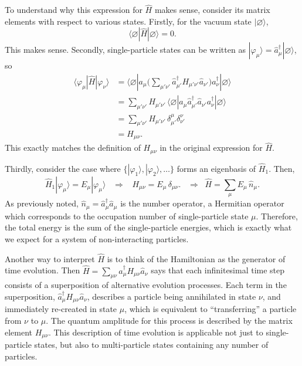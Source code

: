 \documentclass[pra,12pt]{revtex4}
\begin{document}
To understand why this expression for $\hat{H}$ makes sense, consider
its matrix elements with respect to various states.  Firstly, for the
vacuum state $|\varnothing\rangle$,
$$\langle\varnothing|\hat{H}|\varnothing\rangle = 0.$$
This makes sense. Secondly, single-particle states can be written as
$|\varphi_\mu\rangle = \hat{a}^\dagger_\mu|\varnothing\rangle$, so
$$\begin{aligned}\langle\varphi_\mu|\hat{H}|\varphi_\nu\rangle &= \langle\varnothing|a_\mu \Big(\sum_{\mu'\nu'} \hat{a}^\dagger_{\mu'} H_{\mu'\nu'} \hat{a}_{\nu'}\Big) a_\nu^\dagger |\varnothing\rangle \\ &= \sum_{\mu'\nu'} H_{\mu'\nu'} \, \langle\varnothing|a_\mu \hat{a}^\dagger_{\mu'}  \hat{a}_{\nu'} a_\nu^\dagger |\varnothing\rangle \\ &= \sum_{\mu'\nu'} H_{\mu'\nu'} \, \delta^{\mu}_{\mu'} \delta^{\nu}_{\nu'} \\&= H_{\mu\nu}.\end{aligned}$$
This exactly matches the definition of $H_{\mu\nu}$ in the original
expression for $\hat{H}$.

Thirdly, consider the case where
$\{|\varphi_1\rangle,|\varphi_2\rangle,\dots\}$ forms an eigenbasis of
$\hat{H}_1$.  Then,
$$\hat{H}_1|\varphi_\mu\rangle = E_\mu |\varphi_\mu\rangle \;\;\;\Rightarrow\;\;\; H_{\mu\nu} = E_\mu\,\delta_{\mu\nu}. \;\;\;\Rightarrow \;\; \hat{H} = \sum_{\mu} E_\mu \,\hat{n}_\mu.$$
As previously noted, $\hat{n}_\mu = \hat{a}^\dagger_\mu \hat{a}_\mu$
is the number operator, a Hermitian operator which corresponds to the
occupation number of single-particle state $\mu$.  Therefore, the
total energy is the sum of the single-particle energies, which is
exactly what we expect for a system of non-interacting particles.

Another way to interpret $\hat{H}$ is to think of the Hamiltonian as
the generator of time evolution.  Then $\hat{H} = \sum_{\mu\nu}
\hat{a}^\dagger_\mu H_{\mu\nu} \hat{a}_\nu$ says that each
infinitesimal time step consists of a superposition of alternative
evolution processes.  Each term in the superposition,
$\hat{a}^\dagger_\mu H_{\mu\nu} \hat{a}_\nu$, describes a particle
being annihilated in state $\nu$, and immediately re-created in state
$\mu$, which is equivalent to ``transferring'' a particle from $\nu$
to $\mu$.  The quantum amplitude for this process is described by the
matrix element $H_{\mu\nu}$.  This description of time evolution is
applicable not just to single-particle states, but also to
multi-particle states containing any number of particles.
\end{document}
